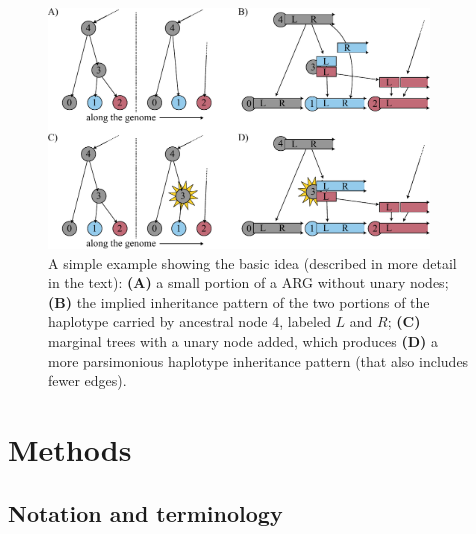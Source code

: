 \documentclass[10pt,twoside,lineno]{gsajnl}
\begin{document}
\begin{figure}
    \begin{center}
    \includegraphics[width=0.9\textwidth]{conceptual_figure.pdf}
    \end{center}
    \caption{
        A simple example showing the basic idea
        (described in more detail in the text):
        \textbf{(A)} a small portion of a ARG without unary nodes;
        \textbf{(B)} the implied inheritance pattern of the two portions of the haplotype carried by ancestral node 4,
        labeled $L$ and $R$;
        \textbf{(C)} marginal trees with a unary node added,
        which produces \textbf{(D)} a more parsimonious haplotype inheritance pattern
        (that also includes fewer edges).
        \label{fig:conceptual}
    }
\end{figure}

\section{Methods}

\subsection{Notation and terminology}
\end{document}
